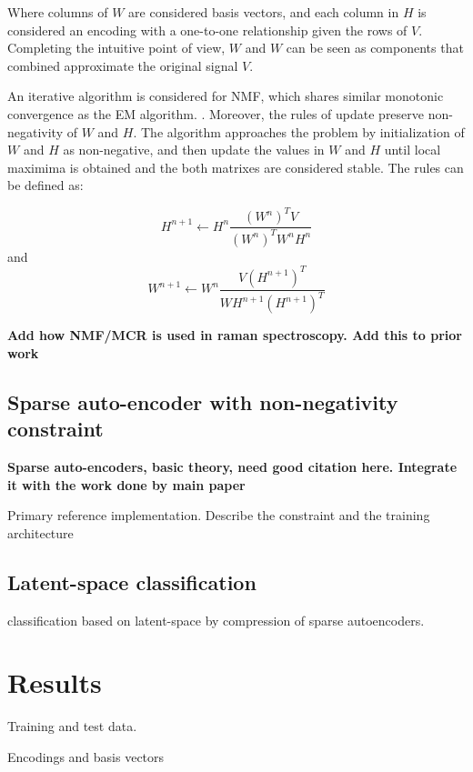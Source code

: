 \documentclass{article}
\begin{document}
Where columns of $W$ are considered basis vectors, and each column in $H$ is considered an encoding with a one-to-one relationship given the rows of $V$. Completing the intuitive point of view, $W$ and $W$ can be seen as components that combined approximate the original signal $V$.

An iterative algorithm is considered for NMF, which shares similar monotonic convergence as the EM algorithm. \cite{Dempster1977}. Moreover, the rules of update preserve non-negativity of $W$ and $H$. The algorithm approaches the problem by initialization of $W$ and $H$ as non-negative, and then update the values in $W$ and $H$ until local maximima is obtained and the both matrixes are considered stable. The rules can be defined as:

\begin{equation}
H^{n+1} \leftarrow H^{n} \frac{(W^n)^TV}{(W^n)^TW^nH^n}
\end{equation}
and 
\begin{equation}
W^{n+1} \leftarrow W^{n} \frac{V(H^{n+1})^T}{WH^{n+1}(H^{n+1})^T}
\end{equation}

\textbf{Add how NMF/MCR is used in raman spectroscopy. Add this to prior work}

\subsection{Sparse auto-encoder with non-negativity constraint}

\textbf{Sparse auto-encoders, basic theory, need good citation here. Integrate it with the work done by main paper}

Primary reference implementation. Describe the constraint and the training architecture

\subsection{Latent-space classification}

classification based on latent-space by compression of sparse autoencoders.

\section{Results}
\label{sec:results}

Training and test data. 

Encodings and basis vectors
\end{document}
